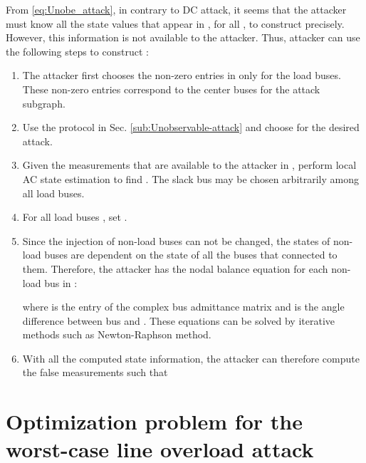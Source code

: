 \documentclass[twocolumn,english,final,journal]{IEEEtran}
\theoremstyle{plain}
\theoremstyle{definition}
\begin{document}
From \eqref{eq:Unobe_attack}, in contrary to DC attack, it seems
that the attacker must know all the state values that appear in ,
for all , to construct  precisely.
However, this information is not available to the attacker. Thus,
attacker can use the following steps to construct :
\begin{enumerate}
\item The attacker first chooses the non-zero entries in  only for the
load buses. These non-zero entries correspond to the center buses
for the attack subgraph.
\item Use the protocol in Sec. \ref{sub:Unobservable-attack} and choose
 for the desired attack.
\item Given the measurements that are available to the attacker in ,
perform local AC state estimation to find . The
slack bus may be chosen arbitrarily among all load buses.
\item For all load buses , set .
\item Since the injection of non-load buses can not be changed, the states
of non-load buses are dependent on the state of all the buses that
connected to them. Therefore, the attacker has the nodal balance equation
for each non-load bus  in : 

where  is the  entry of the
complex bus admittance matrix and 
is the angle difference between bus  and . These equations
can be solved by iterative methods such as Newton-Raphson method.

\item With all the computed state information, the attacker can therefore
compute the false measurements  such that
\end{enumerate}


\section{Optimization problem for the worst-case line overload attack\label{sec:optimization-problem}}
\end{document}
